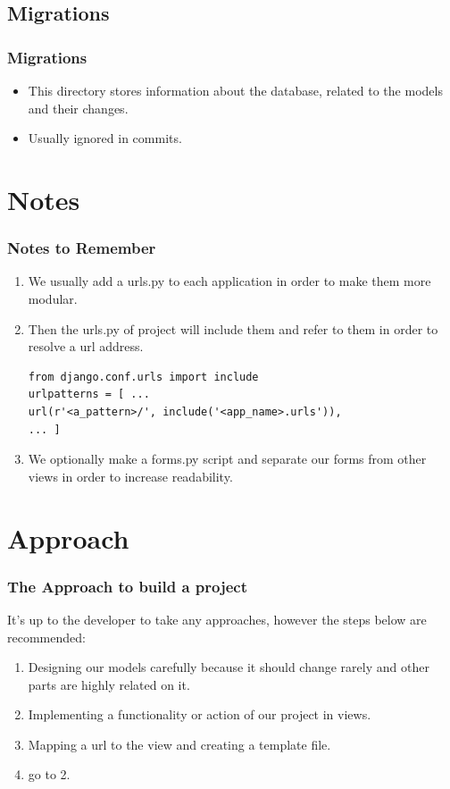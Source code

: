 \documentclass{beamer}
\begin{document}
\subsection{Migrations}
\begin{frame}
	\frametitle{Migrations}
	\begin{itemize}
		\item This directory stores information about the database, related to the models and their changes.
		\item Usually ignored in commits.
	\end{itemize}
\end{frame}

\section{Notes}
\begin{frame}[fragile]
	\frametitle{Notes to Remember}
	\begin{enumerate}
		\item We usually add a urls.py to each application in order to make them more modular.
		\item Then the urls.py of project will include them and refer to them in order to resolve a url address.
		\lstset{language=python}
\begin{lstlisting}[frame=single]
from django.conf.urls import include
urlpatterns = [ ...
url(r'<a_pattern>/', include('<app_name>.urls')),
... ]
\end{lstlisting}
		\item We optionally make a forms.py script and separate our forms from other views in order to increase readability.
	\end{enumerate}
\end{frame}


\section{Approach}
\begin{frame}
	\frametitle{The Approach to build a project}
	It's up to the developer to take any approaches, however the steps below are recommended:
	\begin{enumerate}
		\item Designing our models carefully because it should change rarely and other parts are highly related on it.
		\item Implementing a functionality or action of our project in views.
		\item Mapping a url to the view and creating a template file.
		\item go to 2.
	\end{enumerate}
\end{frame}
\end{document}
